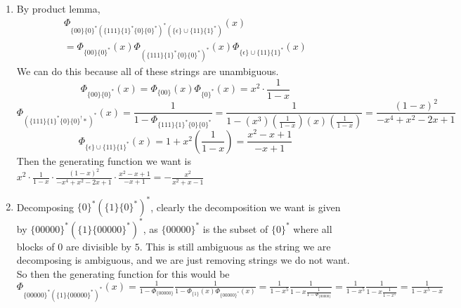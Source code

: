 \documentclass[10pt,english]{article}
\begin{document}
\begin{enumerate}
\pagebreak
\item By product lemma, \begin{align*}\Phi_{\{00\}\{0\}^*(\{111\}\{1\}^*\{0\}\{0\}^*)^*(\{\epsilon\}\cup\{11\}\{1\}^*) }(x)\\=\Phi_{\{00\}\{0\}^*}(x)\Phi_{(\{111\}\{1\}^*\{0\}\{0\}^*)^* }(x)\Phi_{\{\epsilon\}\cup\{11\}\{1\}^* }(x)\end{align*} We can do this because all of these strings are unambiguous. 
$$\Phi_{\{00\}\{0\}^* }(x)=\Phi_{\{00\}}(x)\Phi_{\{0\}^* }(x)=x^2\cdot\frac{1}{1-x}$$  
$$\Phi_{(\{111\}\{1\}^*\{0\}\{0\}^!*)^*}(x)=\frac{1}{1-\Phi_{\{111\}\{1\}^*\{0\}\{0\}^*}}=\frac{1}{1-(x^3)(\frac{1}{1-x})(x)(\frac{1}{1-x})}=\frac{(1-x)^2}{-x^4+x^2-2x+1}$$
$$\Phi_{\{\epsilon\}\cup\{11\}\{1\}^* }(x)=1+x^2\left(\frac{1}{1-x}\right)=\frac{x^2-x+1}{-x+1}$$ 
Then the generating function we want is $x^2\cdot\frac{1}{1-x}\cdot\frac{(1-x)^2}{-x^4+x^2-2x+1}\cdot\frac{x^2-x+1}{-x+1}=-\frac{x^2}{x^2+x-1}$

\pagebreak
\item Decomposing $\{0\}^*(\{1\}\{0\}^*)^*$, clearly the decomposition we want is given by $\{00000\}^*(\{1\}\{00000\}^*)^*$, as $\{00000\}^*$ is the subset of $\{0\}^*$ where all blocks of $0$ are divisible by $5$. This is still ambiguous as the string we are decomposing is ambiguous, and we are just removing strings we do not want. So then the generating function for this would be $\Phi_{\{00000\}^*(\{1\}\{00000\}^*)^*}(x)=\frac{1}{1-\Phi_{\{00000\}}}\frac{1}{1-\Phi_{\{1\} }(x)\Phi_{\{00000\}^*}(x)}=\frac{1}{1-x^5}\frac{1}{1-x\frac{1}{1-\Phi_{\{00000\} }}}=\frac{1}{1-x^5}\frac{1}{1-x\frac{1}{1-x^5}}=\frac{1}{1-x^5-x}$

\end{enumerate}
\end{document}
